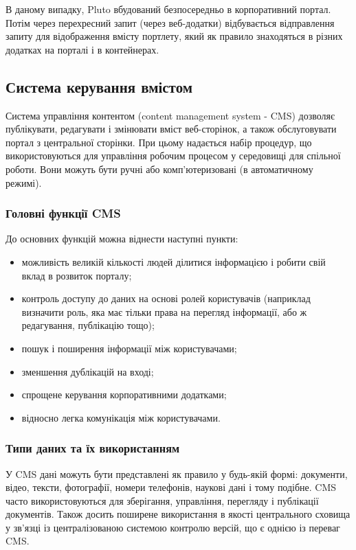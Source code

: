 \par В даному випадку, Pluto вбудований безпосередньо в корпоративний портал. 
Потім через перехресний запит (через веб-додатки) відбувається відправлення запиту для відображення вмісту портлету, який як правило знаходяться в різних додатках на порталі і в контейнерах. 


\subsection{Система керування вмістом}
Система управління контентом (content management system - CMS) дозволяє публікувати, редагувати і змінювати вміст веб-сторінок, а також обслуговувати портал з центральної сторінки. 
При цьому надається набір процедур, що використовуються для управління робочим процесом у середовищі для спільної роботи.
Вони можуть бути ручні або комп'ютеризовані (в автоматичному режимі).
\subsubsection{Головні функції CMS}
До основних функцій можна віднести наступні пункти:
\begin{itemize}
\item можливість великій кількості людей ділитися інформацією і робити свій вклад в розвиток порталу;
\item контроль доступу до даних на основі ролей користувачів (наприклад визначити роль, яка має тільки права на перегляд інформації, або ж редагування, публікацію тощо);
\item пошук і поширення інформації між користувачами;
\item зменшення дублікацій на вході;
\item спрощене керування корпоративними додатками;
\item відносно легка комунікація між користувачами.
\end{itemize}

\subsubsection{Типи даних та їх використанням}
У CMS дані можуть бути представлені як правило у будь-якій формі: документи, відео, тексти, фотографії, номери телефонів, наукові дані і тому подібне. 
CMS часто використовуються для зберігання, управління, перегляду і публікації документів. 
Також досить поширене використання в якості центрального сховища у зв'язці із централізованою системою контролю версій, що є однією із переваг CMS.
